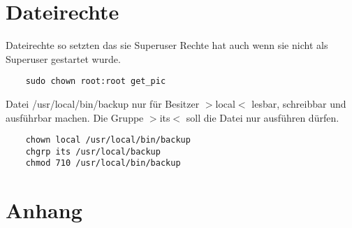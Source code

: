 \documentclass[12pt,a4paper,oneside,ngerman]{article}
\begin{document}
\section{Dateirechte}
Dateirechte so setzten das sie Superuser Rechte hat auch wenn sie nicht als Superuser gestartet wurde.
\begin{lstlisting}
	sudo chown root:root get_pic
\end{lstlisting}

Datei /usr/local/bin/backup nur für Besitzer $>$local$<$ lesbar, schreibbar und ausführbar machen. Die Gruppe $>$its$<$ soll die Datei nur ausführen dürfen.
\begin{lstlisting}
	chown local /usr/local/bin/backup
	chgrp its /usr/local/backup
	chmod 710 /usr/local/bin/backup
\end{lstlisting}


\section{Anhang}






\end{document}
